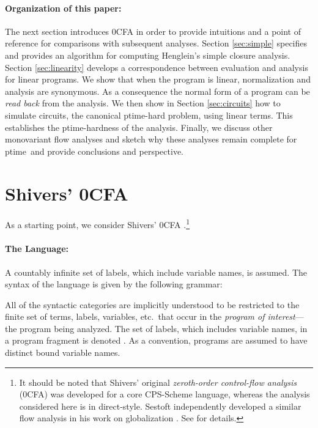 \documentclass{llncs}
\newcommand\ptime{{\sc ptime}}
\begin{document}
\paragraph{Organization of this paper:}

The next section introduces 0CFA in order to provide intuitions and a
point of reference for comparisons with subsequent analyses.  Section
\ref{sec:simple} specifies and provides an algorithm for computing
Henglein's simple closure analysis. Section \ref{sec:linearity}
develops a correspondence between evaluation and analysis for linear
programs.  We show that when the program is linear, normalization
and analysis are synonymous.  As a consequence the normal form of a
program can be {\em read back} from the analysis.  We then show in
Section \ref{sec:circuits} how to simulate circuits, the canonical
\ptime-hard problem, using linear terms.  This establishes the
\ptime-hardness of the analysis.  Finally, we discuss other
monovariant flow analyses and sketch why these analyses remain
complete for \ptime\ and provide conclusions and perspective.


\section{Shivers' 0CFA}
\label{sec:0cfa}

As a starting point, we consider Shivers' 0CFA
\cite{shivers-88,shivers-phd}.\footnote{It should be noted that
Shivers' original {\em zeroth-order control-flow analysis} (0CFA) was
developed for a core CPS-Scheme language, whereas the analysis
considered here is in direct-style.  Sestoft independently developed a
similar flow analysis in his work on globalization
\cite{sestoft-88,sestoft-89}.  See \cite{midtgaard-07,mossin-phd} for
details.}

\paragraph{The Language:} 
A countably infinite set of labels, which include variable names, is
assumed.  The syntax of the language is given by the following
grammar:


All of the syntactic categories are implicitly understood to be
restricted to the finite set of terms, labels, variables, etc.~that
occur in the {\em program of interest}---the program being analyzed.
The set of labels, which includes variable names, in a program
fragment is denoted .  As a convention, programs are assumed
to have distinct bound variable names.
\end{document}
